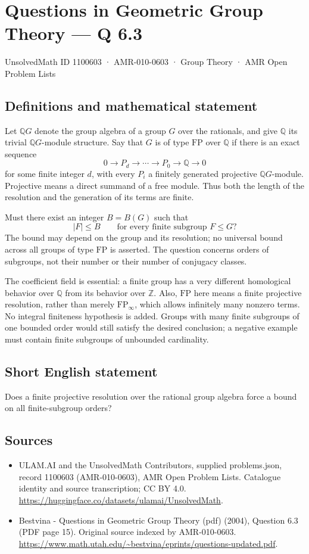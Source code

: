 \documentclass[11pt,a4paper]{article}
\begin{document}
\section*{Questions in Geometric Group Theory — Q 6.3}\label{1100603}
{\small UnsolvedMath ID 1100603 · AMR-010-0603 · Group Theory · AMR Open Problem Lists}
\subsection{Definitions and mathematical statement}
Let $\mathbb QG$ denote the group algebra of a group $G$ over the rationals, and give $\mathbb Q$ its trivial $\mathbb QG$-module structure. Say that $G$ is of type $\mathrm{FP}$ over $\mathbb Q$ if there is an exact sequence
\[
 0\longrightarrow P_d\longrightarrow\cdots\longrightarrow P_0
     \longrightarrow\mathbb Q\longrightarrow0
\]
for some finite integer $d$, with every $P_i$ a finitely generated projective $\mathbb QG$-module. Projective means a direct summand of a free module. Thus both the length of the resolution and the generation of its terms are finite.

Must there exist an integer $B=B(G)$ such that
\[
 |F|\leq B\qquad\text{for every finite subgroup }F\leq G?
\]
The bound may depend on the group and its resolution; no universal bound across all groups of type $\mathrm{FP}$ is asserted. The question concerns orders of subgroups, not their number or their number of conjugacy classes.

The coefficient field is essential: a finite group has a very different homological behavior over $\mathbb Q$ from its behavior over $\mathbb Z$. Also, $\mathrm{FP}$ here means a finite projective resolution, rather than merely $\mathrm{FP}_{\infty}$, which allows infinitely many nonzero terms. No integral finiteness hypothesis is added. Groups with many finite subgroups of one bounded order would still satisfy the desired conclusion; a negative example must contain finite subgroups of unbounded cardinality.
\subsection{Short English statement}
Does a finite projective resolution over the rational group algebra force a bound on all finite-subgroup orders?
\subsection{Sources}
\begin{itemize}
\item[S1] ULAM.AI and the UnsolvedMath Contributors, supplied problems.json, record 1100603 (AMR-010-0603), AMR Open Problem Lists. Catalogue identity and source transcription; CC BY 4.0.
\url{https://huggingface.co/datasets/ulamai/UnsolvedMath}.
\item[S2] Bestvina - Questions in Geometric Group Theory (pdf) (2004), Question 6.3 (PDF page 15). Original source indexed by AMR-010-0603.
\url{https://www.math.utah.edu/~bestvina/eprints/questions-updated.pdf}.
\end{itemize}
\end{document}
